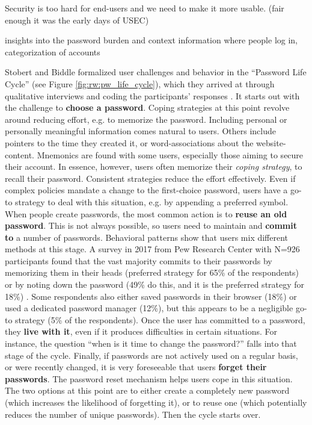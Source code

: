 Security is too hard for end-users and we need to make it more usable. (fair enough it was the early days of USEC) \cite{Dourish2004UserStrategiesEveryday}

insights into the password burden and context information where people log in, categorization of accounts \cite{Hayashi2011DiaryStudyPWs}

Stobert and Biddle formalized user challenges and behavior in the ``Password Life Cycle'' (see Figure \ref{fig:rw:pw_life_cycle}), which they arrived at through qualitative interviews and coding the participants' responses \cite{Stobert2014PasswordLifeCycle}. It starts out with the challenge to \textbf{choose a password}. Coping strategies at this point revolve around reducing effort, e.g. to memorize the password. Including personal or personally meaningful information comes natural to users. Others include pointers to the time they created it, or word-associations about the website-content. Mnemonics are found with some users, especially those aiming to secure their account. In essence, however, users often memorize their \textit{coping strategy}, to recall their password. Consistent strategies reduce the effort effectively. Even if complex policies mandate a change to the first-choice password, users have a go-to strategy to deal with this situation, e.g. by appending a preferred symbol. When people create passwords, the most common action is to \textbf{reuse an old password}. This is not always possible, so users need to maintain and \textbf{commit to} a number of passwords. Behavioral patterns show that users mix different methods at this stage. A survey in 2017 from Pew Research Center with N=926 participants found that the vast majority commits to their passwords by memorizing them in their heads (preferred strategy for 65\% of the respondents) or by noting down the password (49\% do this, and it is the preferred strategy for 18\%) \cite{Olmstead2017AmerciansCybersecurity}. Some respondents also either saved passwords in their browser (18\%) or used a dedicated password manager (12\%), but this appears to be a negligible go-to strategy (5\% of the respondents). Once the user has committed to a password, they \textbf{live with it}, even if it produces difficulties in certain situations. For instance, the question ``when is it time to change the password?'' falls into that stage of the cycle. Finally, if passwords are not actively used on a regular basis, or were recently changed, it is very foreseeable that users \textbf{forget their passwords}. The password reset mechanism helps users cope in this situation. The two options at this point are to either create a completely new password (which increases the likelihood of forgetting it), or to reuse one (which potentially reduces the number of unique passwords). Then the cycle starts over. 

